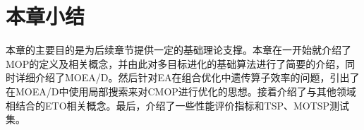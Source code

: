 
\section{本章小结}
\label{sec:背景介绍:本章小结}
本章的主要目的是为后续章节提供一定的基础理论支撑。本章在一开始就介绍了MOP的定义及相关概念，并由此对多目标进化的基础算法进行了简要的介绍，同时详细介绍了MOEA/D。然后针对EA在组合优化中遗传算子效率的问题，引出了在MOEA/D中使用局部搜索来对CMOP进行优化的思想。接着介绍了与其他领域相结合的ETO相关概念。最后，介绍了一些性能评价指标和TSP、MOTSP测试集。